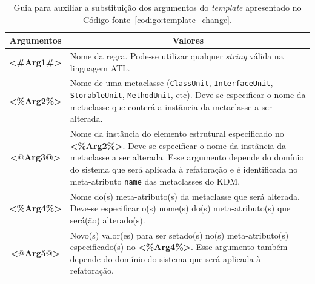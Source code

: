 \begin{table}[h]
\centering
\caption{Guia para auxiliar a substituição dos argumentos do \textit{template} apresentado no Código-fonte~\ref{codigo:template_change}.}
\label{tab:guia_template_operacao_change}
\begin{tabular}{ | m{1.7cm} | m{12cm}| } 
\hline
\multicolumn{1}{|c|}{Argumentos}                                         & \multicolumn{1}{c|}{Valores} \\ \hline
\multicolumn{1}{|c|}{\textbf{<\#Arg1\#>}} & Nome da regra. Pode-se utilizar qualquer \textit{string} válida na linguagem ATL. \\  
\hline
\multicolumn{1}{|c|}{\textbf{<\%Arg2\%>}} & Nome de uma metaclasse (\texttt{ClassUnit}, \texttt{InterfaceUnit}, \texttt{StorableUnit}, \texttt{MethodUnit}, etc). Deve-se especificar o nome da metaclasse que conterá a instância da metaclasse a ser alterada. \\ 
\hline
\multicolumn{1}{|c|}{\textbf{<$@$Arg3@>}} & Nome da instância do elemento estrutural especificado no \textbf{<\%Arg2\%>}. Deve-se especificar o nome da instância da metaclasse a ser alterada. Esse argumento depende do domínio do sistema que será aplicada à refatoração e é identificada no meta-atributo \texttt{name} das metaclasses do KDM.  \\ 
\hline
\multicolumn{1}{|c|}{\textbf{<\%Arg4\%>}} & Nome do(s) meta-atributo(s) da metaclasse que será alterada. Deve-se especificar o(s) nome(s) do(s) meta-atributo(s) que será(ão) alterado(s).  \\ 
\hline
\multicolumn{1}{|c|}{\textbf{<$@$Arg5$@$>}} & Novo(s) valor(es) para ser setado(s) no(s) meta-atributo(s) especificado(s) no \textbf{<\%Arg4\%>}. Esse argumento também depende do domínio do sistema que será aplicada à refatoração.  \\ 
\hline
\end{tabular}
\end{table}

